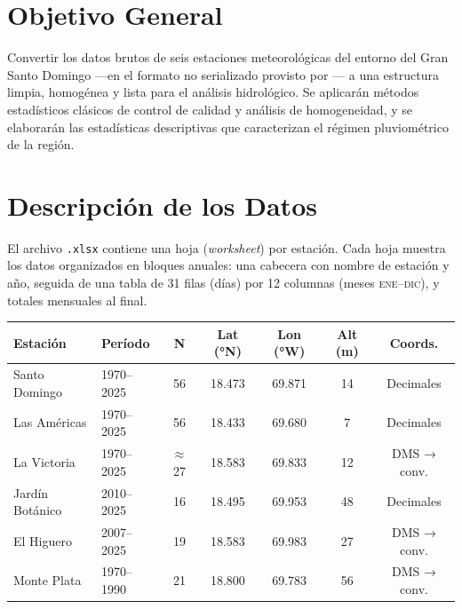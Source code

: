 \documentclass[11pt]{article}
\begin{document}
\section*{Objetivo General}

Convertir los datos brutos de seis estaciones meteorológicas del entorno del Gran
Santo Domingo ---en el formato no serializado provisto por \indomet{}--- a una
estructura limpia, homogénea y lista para el análisis hidrológico.
Se aplicarán métodos estadísticos clásicos de control de calidad y análisis de
homogeneidad, y se elaborarán las estadísticas descriptivas que caracterizan el
régimen pluviométrico de la región.

\section*{Descripción de los Datos}

El archivo \texttt{.xlsx} contiene una hoja (\emph{worksheet}) por estación.
Cada hoja muestra los datos organizados en bloques anuales: una cabecera con nombre
de estación y año, seguida de una tabla de 31 filas (días) por 12 columnas
(meses \textsc{ene}–\textsc{dic}), y totales mensuales al final.

\begin{center}
\small
{}
\begin{tabular}{llccccc}
\toprule
\textbf{Estación} & \textbf{Período} & \textbf{N} & \textbf{Lat (°N)} & \textbf{Lon (°W)} & \textbf{Alt (m)} & \textbf{Coords.} \\
\midrule
Santo Domingo   & 1970–2025 & 56  & 18.473 & 69.871 & 14 & Decimales \\
Las Américas    & 1970–2025 & 56  & 18.433 & 69.680 & 7  & Decimales \\
La Victoria     & 1970–2025 & $\approx$27 & 18.583 & 69.833 & 12 & DMS → conv. \\
Jardín Botánico & 2010–2025 & 16  & 18.495 & 69.953 & 48 & Decimales \\
El Higuero      & 2007–2025 & 19  & 18.583 & 69.983 & 27 & DMS → conv. \\
Monte Plata     & 1970–1990 & 21  & 18.800 & 69.783 & 56 & DMS → conv. \\
\bottomrule
\end{tabular}
\end{center}
\end{document}
